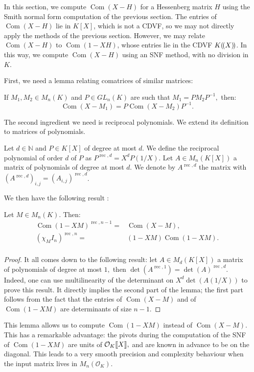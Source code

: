 \documentclass{sig-alternate-05-2015}
\DeclareMathOperator{\com}{Com}
\DeclareMathOperator{\rec}{rec}
\newcommand{\OK}{\mathcal{O}_K}
\newcommand{\llb}{[\mkern-2.5mu[}
\newcommand{\rrb}{]\mkern-2.5mu]}
\newcommand{\llp}{(\mkern-2.5mu(}
\newcommand{\rrp}{)\mkern-2.5mu)}
\begin{document}
In this section, we compute $\com(X-H)$ for a Hessenberg matrix $H$
using the Smith normal form computation of the previous section.
The entries of $\com(X-H)$ lie in $K[X]$, which is not a CDVF,
so we may not directly apply the methods of the previous section.
However, we may relate $\com(X-H)$ to $\com(1-XH)$, whose
entries lie in the CDVF $K\llp X\rrp$.  In this way, we compute $\com(X-H)$
using an SNF method, with no division in $K$.

First, we need a lemma relating comatrices of
similar matrices:

\begin{lem} \label{lem:comatrix_of_similar}
If $M_1,M_2 \in M_n(K)$ and $P \in GL_n (K)$ are such that
$M_1=PM_2P^{-1},$ then:
\[ \com (X-M_1)=P \com (X-M_2) P^{-1}. \] 
\end{lem}

The second ingredient we need is reciprocal polynomials.
We extend its definition to matrices of polynomials.
\begin{deftn}
Let $d \in \mathbb{N}$ and $P \in K[X]$ of degree at most $d.$ 
We define the reciprocal polynomial of order $d$ of $P$ as $P^{\rec,d}=X^d P \left( 1/X \right).$
Let $A \in M_n(K[X])$ a matrix of polynomials of degree at most $d.$
We denote by $A^{\rec,d}$ the matrix with $(A^{\rec,d})_{i,j} = (A_{i,j})^{\rec,d}$.
\end{deftn}
We then have the following result :
\begin{lem}
Let $M \in M_n(K).$ Then:
\begin{eqnarray*}
\com(1-XM)^{\rec,n-1}=&\com(X-M), \\
(\chi_M I_n)^{\rec,n}=&(1-XM) \com(1-XM).\\
\end{eqnarray*}
\end{lem}
\begin{proof}
It all comes down to the following result:
let $A \in M_d(K[X])$ a matrix of polynomials of degree at most $1,$
then $\det (A^{\rec,1})=\det(A)^{\rec,d}.$
Indeed, one can use multilinearity of the determinant on $X^d \det(A(1/X))$
to prove this result.
It directly implies the second part of the lemma; the first part follows
from the fact that the entries of $\com(X-M)$ and of $\com(1-XM)$
are determinants of size $n-1$.
\end{proof}

This lemma allows us to compute $\com(1-XM)$ instead of $\com(X-M).$
This has a remarkable advantage: the pivots during the computation of
the SNF of $\com(1-XM)$ are units of $\OK\llb X\rrb,$ and are known
in advance to be on the diagonal. This leads to a very smooth
precision and complexity behaviour when the input matrix lives in 
$M_n(\OK).$ 
\end{document}
